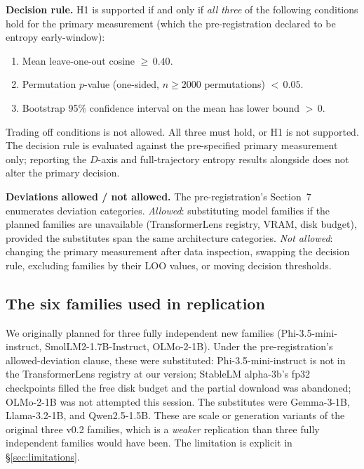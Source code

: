 \documentclass[11pt,letterpaper]{article}
\begin{document}
\textbf{Decision rule.} H1 is supported if and only if \emph{all three} of
the following conditions hold for the primary measurement (which the
pre-registration declared to be entropy early-window):
\begin{enumerate}[leftmargin=18pt,itemsep=1pt,topsep=2pt]
\item[(a)] Mean leave-one-out cosine $\geq\,0.40$.
\item[(b)] Permutation $p$-value (one-sided, $n\!\geq\!2000$ permutations) $<\,0.05$.
\item[(c)] Bootstrap 95\% confidence interval on the mean has lower bound $>\,0$.
\end{enumerate}
Trading off conditions is not allowed. All three must hold, or H1 is not
supported. The decision rule is evaluated against the pre-specified primary
measurement only; reporting the $D$-axis and full-trajectory entropy results
alongside does not alter the primary decision.

\textbf{Deviations allowed / not allowed.} The pre-registration's
Section~7 enumerates deviation categories. \emph{Allowed}: substituting
model families if the planned families are unavailable (TransformerLens
registry, VRAM, disk budget), provided the substitutes span the same
architecture categories. \emph{Not allowed}: changing the primary
measurement after data inspection, swapping the decision rule, excluding
families by their LOO values, or moving decision thresholds.

\subsection{The six families used in replication}

We originally planned for three fully independent new families
(Phi-3.5-mini-instruct, SmolLM2-1.7B-Instruct, OLMo-2-1B). Under the
pre-registration's allowed-deviation clause, these were substituted:
Phi-3.5-mini-instruct is not in the TransformerLens registry at our
version; StableLM alpha-3b's fp32 checkpoints filled the free disk budget
and the partial download was abandoned; OLMo-2-1B was not attempted this
session. The substitutes were Gemma-3-1B, Llama-3.2-1B, and Qwen2.5-1.5B.
These are scale or generation variants of the original three v0.2
families, which is a \emph{weaker} replication than three fully
independent families would have been. The limitation is explicit in
\S\ref{sec:limitations}.
\end{document}

